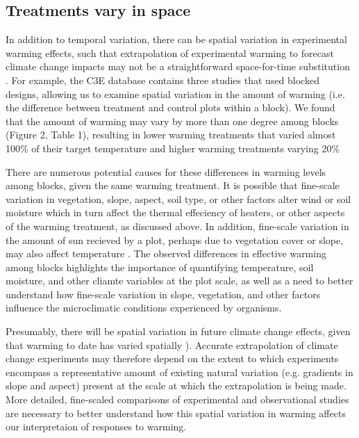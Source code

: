 \documentclass{article}
\begin{document}
\subsection* {Treatments vary in space}
In addition to temporal variation, there can be spatial variation in experimental warming effects, such that extrapolation of experimental warming to forecast climate change impacts may not be a straightforward space-for-time substitution \citep{johnson2008,jochner2013}. For example, the C3E database contains three studies that used blocked designs, allowing us to examine spatial variation in the amount of warming (i.e. the difference between treatment and control plots within a block). We found that the amount of warming may vary by more than one degree among blocks (Figure 2, Table 1), resulting in lower warming treatments that varied almost 100\% of their target temperature and higher warming treatments varying 20\% %
\par There are numerous potential causes for these differences in warming levels among blocks, given the same warming treatment. It is possible that fine-scale variation in vegetation, slope, aspect, soil type, or other factors alter wind or soil moisture which in turn affect the thermal effeciency of heaters, or other aspects of the warming treatment, as discussed above\citep{peterjohn1993,kimball2005,kimball2008,hoeppner2012}.  In addition, fine-scale variation in the amount of sun recieved by a plot, perhaps due to vegetation cover or slope, may also affect temperature \citep{rollinson2015}. The observed differences in effective warming among blocks highlights the importance of quantifying temperature, soil moisture, and other cliamte variables at the plot scale, as well as a need to better understand how fine-scale variation in slope, vegetation, and other factors influence the microclimatic conditions experienced by organisms.  
\par Presumably, there will be spatial variation in future climate change effects, given that warming to date has varied spatially \citep{ipcc2013}).  Accurate extrapolation of climate change experiments may therefore depend on the extent to which experiments encompass a representative amount of existing natural variation (e.g. gradients in slope and aspect) present at the scale at which the extrapolation is being made. More detailed, fine-scaled comparisons of experimental and observational studies are necessary to better understand how this spatial variation in warming affects our interpretaion of responses to warming. 
\end{document}
